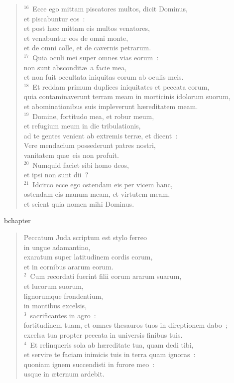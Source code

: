 \begin{verse}
${}^{16}$~Ecce ego mittam piscatores multos, dicit Dominus,\\ et piscabuntur eos~:\\ et post h\ae c mittam eis multos venatores,\\ et venabuntur eos de omni monte,\\ et de omni colle, et de cavernis petrarum.\\
${}^{17}$~Quia oculi mei super omnes vias eorum~:\\ non sunt abscondit\ae\ a facie mea,\\ et non fuit occultata iniquitas eorum ab oculis meis.\\
${}^{18}$~Et reddam primum duplices iniquitates et peccata eorum,\\ quia contaminaverunt terram meam in morticinis idolorum suorum,\\ et abominationibus suis impleverunt h\ae reditatem meam.\\
${}^{19}$~Domine, fortitudo mea, et robur meum,\\ et refugium meum in die tribulationis,\\ ad te gentes venient ab extremis terr\ae , et dicent~:\\ Vere mendacium possederunt patres nostri,\\ vanitatem qu\ae\ eis non profuit.\\
${}^{20}$~Numquid faciet sibi homo deos,\\ et ipsi non sunt dii~?\\
${}^{21}$~Idcirco ecce ego ostendam eis per vicem hanc,\\ ostendam eis manum meam, et virtutem meam,\\ et scient quia nomen mihi Dominus.\end{verse}


bchapter\begin{verse}\vspace{-19pt}Peccatum Juda scriptum est stylo ferreo\\ in ungue adamantino,\\ exaratum super latitudinem cordis eorum,\\ et in cornibus ararum eorum.\\
${}^{2}$~Cum recordati fuerint filii eorum ararum suarum,\\ et lucorum suorum,\\ lignorumque frondentium,\\ in montibus excelsis,\\
${}^{3}$~sacrificantes in agro~:\\ fortitudinem tuam, et omnes thesauros tuos in direptionem dabo~;\\ excelsa tua propter peccata in universis finibus tuis.\\
${}^{4}$~Et relinqueris sola ab h\ae reditate tua, quam dedi tibi,\\ et servire te faciam inimicis tuis in terra quam ignoras~:\\ quoniam ignem succendisti in furore meo~:\\ usque in \ae ternum ardebit.\end{verse}


